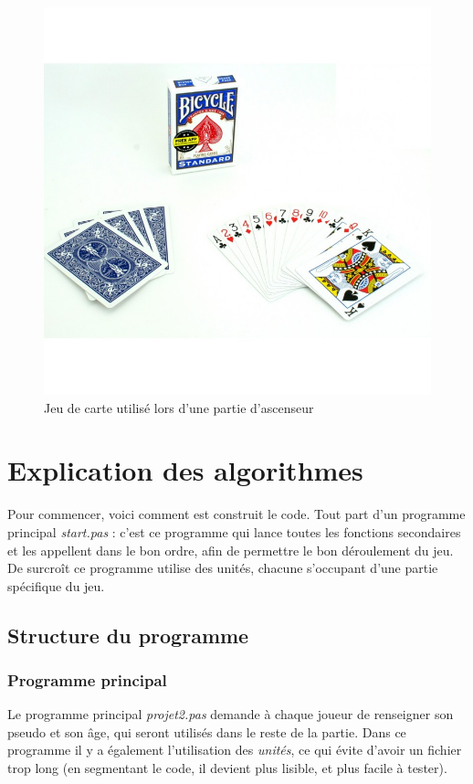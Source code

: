 \documentclass[12pt]{report}
\begin{document}
	\begin{figure}[h]
	\centering
	\includegraphics[scale=0.25]{jeu-de-cartes.jpg}
	 \caption{Jeu de carte utilisé lors d'une partie d'ascenseur}
	\end{figure}
		

		
\clearpage

		
\section{Explication des algorithmes}
Pour commencer, voici comment est construit le code. Tout part d'un programme principal \textit{start.pas} : c'est ce programme qui lance toutes les fonctions secondaires et les appellent dans le bon ordre, afin de permettre le bon déroulement du jeu. De surcroît ce programme utilise des unités, chacune s'occupant d'une partie spécifique du jeu.
  	\subsection{Structure du programme}
  
   \subsubsection{Programme principal}
   Le programme principal \textit{projet2.pas} demande à chaque joueur de renseigner son pseudo et son âge, qui seront utilisés dans le reste de la partie. Dans ce programme il y a également l'utilisation des \textit{unités}, ce qui évite d'avoir un fichier trop long (en segmentant le code, il devient plus lisible, et plus facile à tester). \\
   
\end{document}
